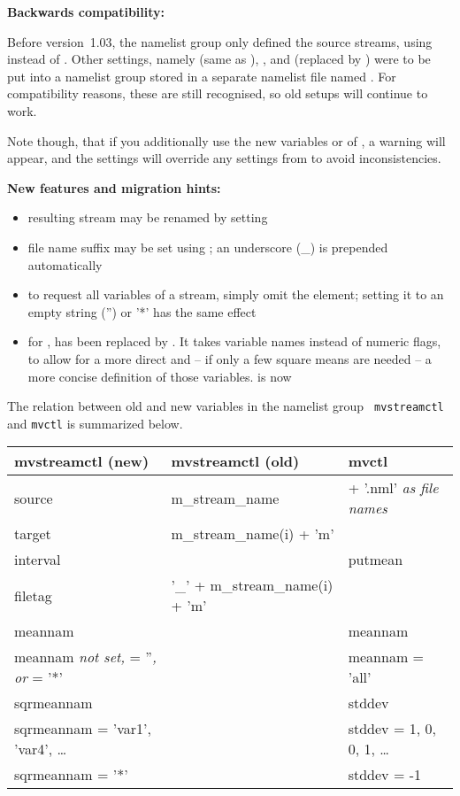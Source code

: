 {\bf Backwards compatibility:}

Before \echam{} version~1.03, the namelist group  only defined
the source streams, using  instead of .
Other settings, namely  (same as ),
, and  (replaced by )
were to be put into a namelist group  stored in a separate
namelist file named
.
For compatibility reasons, these are still recognised,
so old setups will continue to work.

Note though, that if you additionally use the new variables 
or  of , a warning will appear,
and the   settings will override any settings from
 to avoid inconsistencies.

{\bf New features and migration hints:}

\begin{itemize}
\item resulting stream may be renamed by setting 
\item file name suffix may be set using ;
      an underscore (\_) is prepended automatically
\item to request all variables of a stream, simply omit the
   element; 
      setting it to an empty string ('') or '*' has the same effect
\item for , 
       has been replaced by .
      It takes variable names instead of numeric flags,
      to allow for a more direct and -- if only a few square means are needed --
      a more concise definition of those variables.
       is now 
\end{itemize}

The relation between old and new variables in the namelist group {\tt
  mvstreamctl} and {\tt mvctl} is summarized below.

\begin{tabular}{lll} \hline
\textbf{mvstreamctl (new)} & \textbf{mvstreamctl (old)} & \textbf{mvctl} \\\hline
source & m\_stream\_name & + '.nml' \emph{as file names} \\
target & m\_stream\_name(i) + 'm' & \\
interval & & putmean \\
filetag & '\_' + m\_stream\_name(i) + 'm' & \\
meannam & & meannam \\
meannam \emph{not set,} = ''\emph{, or} = '*' & & meannam = 'all' \\
sqrmeannam & & stddev \\
sqrmeannam = 'var1', 'var4', \dots & & stddev = 1, 0, 0, 1, \dots \\
sqrmeannam = '*' & & stddev = -1 \\\hline
\end{tabular}




